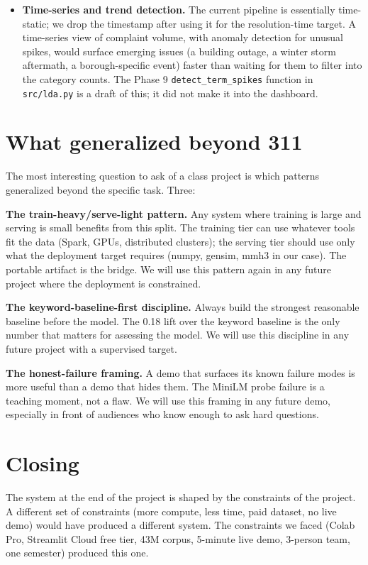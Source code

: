 \documentclass[11pt,letterpaper]{book}
\begin{document}
\begin{itemize}
\item \textbf{Time-series and trend detection.} The current pipeline is essentially time-static; we drop the timestamp after using it for the resolution-time target. A time-series view of complaint volume, with anomaly detection for unusual spikes, would surface emerging issues (a building outage, a winter storm aftermath, a borough-specific event) faster than waiting for them to filter into the category counts. The Phase 9 \texttt{detect\_term\_spikes} function in \texttt{src/lda.py} is a draft of this; it did not make it into the dashboard.
\end{itemize}

\section{What generalized beyond 311}

The most interesting question to ask of a class project is which patterns generalized beyond the specific task. Three:

\textbf{The train-heavy/serve-light pattern.} Any system where training is large and serving is small benefits from this split. The training tier can use whatever tools fit the data (Spark, GPUs, distributed clusters); the serving tier should use only what the deployment target requires (numpy, gensim, mmh3 in our case). The portable artifact is the bridge. We will use this pattern again in any future project where the deployment is constrained.

\textbf{The keyword-baseline-first discipline.} Always build the strongest reasonable baseline before the model. The 0.18 lift over the keyword baseline is the only number that matters for assessing the model. We will use this discipline in any future project with a supervised target.

\textbf{The honest-failure framing.} A demo that surfaces its known failure modes is more useful than a demo that hides them. The MiniLM probe failure is a teaching moment, not a flaw. We will use this framing in any future demo, especially in front of audiences who know enough to ask hard questions.

\section{Closing}

The system at the end of the project is shaped by the constraints of the project. A different set of constraints (more compute, less time, paid dataset, no live demo) would have produced a different system. The constraints we faced (Colab Pro, Streamlit Cloud free tier, 43M corpus, 5-minute live demo, 3-person team, one semester) produced this one.
\end{document}

